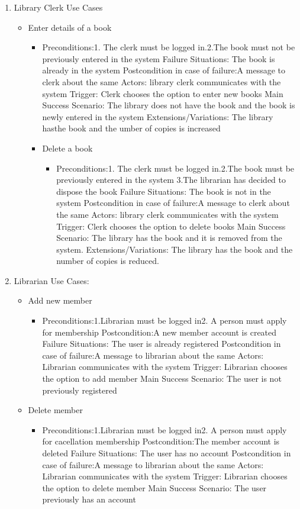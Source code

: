 \documentclass{article}
\begin{document}
\begin{enumerate}
\item Library Clerk Use Cases
 \begin{itemize}
 \item Enter details of a book
 \begin{itemize}
 \item Preconditions:1. The clerk must be logged in.2.The book must not be previously entered in the system
 Failure Situations: The book is already in the system
 Postcondition in case of failure:A message to clerk about the same
 Actors: library clerk communicates with the system
 Trigger: Clerk chooses the option to enter new books
 Main Success Scenario: The library  does not have the book and the book is newly entered in the system
 Extensions/Variations: The library hasthe book and the umber of copies is increased
 \item Delete a book 
 \begin{itemize}
	\item 	Preconditions:1. The clerk must be logged in.2.The book must  be previously entered in the system 3.The librarian has decided to dispose the book
 Failure Situations: The book is not in the system
 Postcondition in case of failure:A message to clerk about the same
 Actors: library clerk communicates with the system
 Trigger: Clerk chooses the option to delete books
 Main Success Scenario: The library  has the book and it is removed from the system.
 Extensions/Variations: The library has the book and the number of copies is reduced.
\end{itemize}	 
 
 \end{itemize}
 \end{itemize}


\item Librarian Use Cases:
\begin{itemize}
 \item Add new member
 \begin{itemize}
  \item Preconditions:1.Librarian must be logged in2. A person must apply for membership
 Postcondition:A new member account is created 
 Failure Situations: The user is already registered
 Postcondition in case of failure:A message to librarian about the same
 Actors: Librarian communicates with the system
 Trigger: Librarian  chooses the option to add member
 Main Success Scenario: The user is not previously registered
 \end{itemize}

\item Delete member
 \begin{itemize}
  \item Preconditions:1.Librarian must be logged in2. A person must apply for cacellation membership
 Postcondition:The member account is deleted
 Failure Situations: The user has no account
 Postcondition in case of failure:A message to librarian about the same
 Actors: Librarian communicates with the system
 Trigger: Librarian  chooses the option to delete member
 Main Success Scenario: The user   previously has an account
 \end{itemize}
 

\end{itemize}
\end{enumerate}
\end{document}
